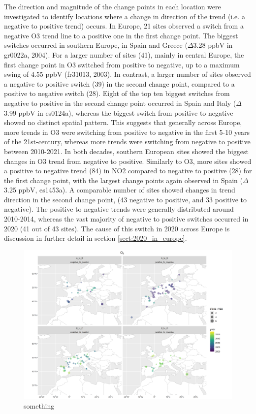 \documentclass[journal abbreviation, manuscript]{copernicus}
\begin{document}
The direction and magnitude of the change points in each location were investigated to identify locations where a change in direction of the trend (i.e. a negative to positive trend) occurs. In Europe, 21 sites observed a switch from a negative O3 trend line to a positive one in the first change point. The biggest switches occurred in southern Europe, in Spain and Greece ($\Delta$3.28 ppbV in gr0022a, 2004). For a larger number of sites (41), mainly in central Europe, the first change point in O3 switched from positive to negative, up to a maximum swing of 4.55 ppbV (fr31013, 2003). In contrast, a larger number of sites observed a negative to positive switch (39) in the second change point, compared to a positive to negative switch (28). Eight of the top ten biggest switches from negative to positive in the second change point occurred in Spain and Italy ($\Delta$3.99 ppbV in es0124a), whereas the biggest switch from positive to negative showed no distinct spatial pattern. This suggests that generally across Europe, more trends in O3 were switching from positive to negative in the first 5-10 years of the 21st-century, whereas more trends were switching from negative to positive between 2010-2021. In both decades, southern European sites showed the biggest changes in O3 trend from negative to positive.
Similarly to O3, more sites showed a positive to negative trend (84) in NO2 compared to negative to positive (28) for the first change point, with the largest change points again observed in Spain ($\Delta$3.25 ppbV, es1453a). A comparable number of sites showed changes in trend direction in the second change point, (43 negative to positive, and 33 positive to negative). The positive to negative trends were generally distributed around 2010-2014, whereas the vast majority of negative to positive switches occurred in 2020 (41 out of 43 sites). The cause of this switch in 2020 across Europe is discussion in further detail in section \ref{sect:2020_in_europe}.

\begin{figure}[t]
\includegraphics[width=12cm]{plots/EU_o3_tau_0.5_changepoint_year_mag_map.png}
\caption{something}
\label{us_o3_changepoint_map}
\end{figure}
\end{document}
